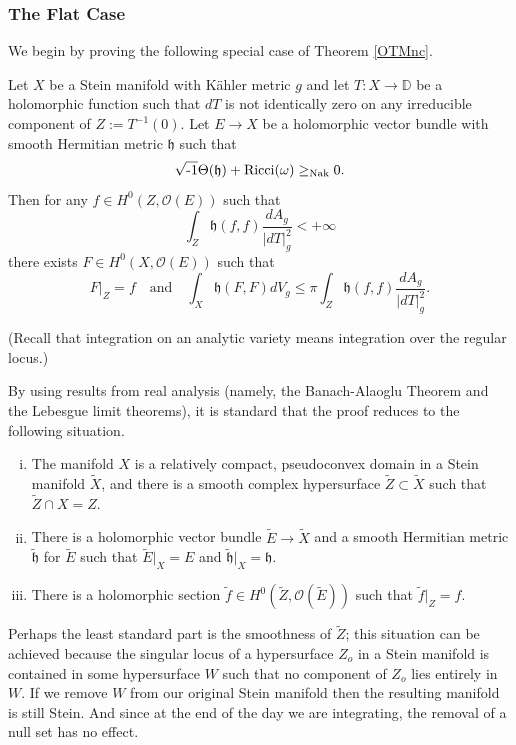 \documentclass[12pt,hidelinks]{amsart}
\newcommand{\noi}{\noindent}
\newcommand{\cO}{{\mathcal O}}
\newcommand{\fh}{{\mathfrak h}}
\newcommand{\bbD}{{\mathbb D}}
\newcommand{\ii}{\sqrt{\text{\rm -}1}}
\begin{document}
\subsubsection{\sc The Flat Case}

We begin by proving the following special case of Theorem \ref{OTMnc}. 

\begin{thm}\label{ot-vb-flat}
Let $X$ be a Stein manifold with K\"ahler metric $g$ and let $T : X \to \bbD$ be a holomorphic function such that $dT$ is not identically zero on any irreducible component of $Z := T^{-1}(0)$.  Let $E \to X$ be a holomorphic vector bundle with smooth Hermitian metric $\fh$ such that 
\[
\ii \Theta (\fh) + {\rm Ricci}(\omega) \ge_{{\rm Nak}} 0.
\]
Then for any $f \in H^0 (Z ,\cO(E))$ such that 
\[
\int _Z \fh (f,f)\frac{dA_{g}}{|dT|^2_{g}} < +\infty
\]
there exists $F \in H^0(X, \cO(E))$ such that 
\[
F|_Z = f \quad \text{and} \quad \int _X \fh(F, F)dV_{g} \le \pi \int _Z \fh (f,f)\frac{dA_{g}}{|dT|^2_{g}}.
\]
\end{thm}

\noi (Recall that integration on an analytic variety means integration over the regular locus.)

By using results from real analysis (namely, the Banach-Alaoglu Theorem and the Lebesgue limit theorems), it is standard that the proof reduces to the following situation.

\begin{enumerate}[i.]
\item  The manifold $X$ is a relatively compact, pseudoconvex domain in a Stein manifold $\tilde X$, and there is a smooth complex hypersurface $\tilde Z \subset \tilde X$ such that $\tilde Z \cap X = Z$.
\item  There is a holomorphic vector bundle $\tilde E \to \tilde X$ and a smooth Hermitian metric $\tilde \fh$ for $\tilde E$ such that $\tilde E |_X = E$ and $\tilde \fh |_X = \fh$.
\item  There is a holomorphic section $\tilde f \in H^0(\tilde Z, \cO (\tilde E))$ such that $\tilde f|_Z = f$.
\end{enumerate}
Perhaps the least standard part is the smoothness of $\tilde Z$; this situation can be achieved because the singular locus of a hypersurface $Z_o$ in a Stein manifold is contained in some hypersurface $W$ such that no component of $Z_o$ lies entirely in $W$.  If we remove $W$ from our original Stein manifold then the resulting manifold is still Stein.  And since at the end of the day we are integrating, the removal of a null set has no effect.  
\end{document}
